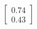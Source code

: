 \documentclass[preview]{standalone}
\begin{document}
\begin{align*}
\begin{bmatrix} 0.74 \\ 0.43 \end{bmatrix}
\end{align*}
\end{document}
